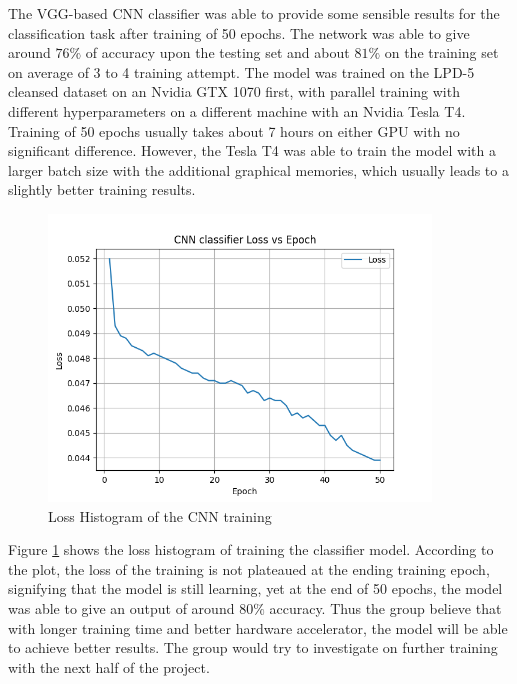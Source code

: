 \begin{par}

    \par \hspace{15pt} The VGG-based CNN classifier was able to provide some sensible results for the classification task after training of 50 epochs. The network was able to give around $76\%$ of accuracy upon the testing set and about $81\%$ on the training set on average of 3 to 4 training attempt. The model was trained on the LPD-5 cleansed dataset on an Nvidia GTX 1070 first, with parallel training with different hyperparameters on a different machine with an Nvidia Tesla T4. Training of 50 epochs usually takes about 7 hours on either GPU with no significant difference. However, the Tesla T4 was able to train the model with a larger batch size with the additional graphical memories, which usually leads to a slightly better training results. 
    
    \begin{figure}[H]
        \centering
        \includegraphics[width=4in]{image/loss_vs_epoch_train_log_2022-03-09_23-05-36}
        \caption{Loss Histogram of the CNN training}
        \label{fig:loss_hist}
    \end{figure}
    
    \par \hspace{15pt} Figure \ref{fig:loss_hist} shows the loss histogram of training the classifier model. According to the plot, the loss of the training is not plateaued at the ending training epoch, signifying that the model is still learning, yet at the end of 50 epochs, the model was able to give an output of around $80\%$ accuracy. Thus the group believe that with longer training time and better hardware accelerator, the model will be able to achieve better results. The group would try to investigate on further training with the next half of the project.

\end{par}